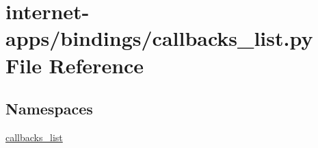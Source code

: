 \hypertarget{internet-apps_2bindings_2callbacks__list_8py}{}\section{internet-\/apps/bindings/callbacks\+\_\+list.py File Reference}
\label{internet-apps_2bindings_2callbacks__list_8py}
\subsection*{Namespaces}
\begin{DoxyCompactItemize}
\item 
 \hyperlink{namespacecallbacks__list}{callbacks\+\_\+list}
\end{DoxyCompactItemize}
